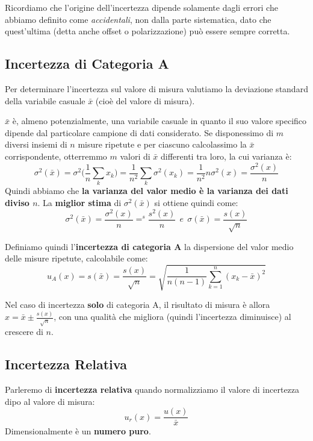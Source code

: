 \documentclass[a4paper,11pt]{report}
\begin{document}
Ricordiamo che l'origine dell'incertezza dipende solamente dagli errori che abbiamo definito come \textit{accidentali}, non dalla parte sistematica, dato che quest'ultima (detta anche offset o polarizzazione) può essere sempre corretta.

\subsection{Incertezza di Categoria A}
Per determinare l'incertezza sul valore di misura valutiamo la deviazione standard della variabile casuale $\bar{x}$ (cioè del valore di misura).

$\bar{x}$ è, almeno potenzialmente, una variabile casuale in quanto il suo valore specifico dipende dal particolare campione di dati considerato. Se disponessimo di $m$ diversi insiemi di $n$ misure ripetute e per ciascuno calcolassimo la $\bar{x}$ corrispondente, otterremmo $m$ valori di $\bar{x}$ differenti tra loro, la cui varianza è:
$$
  \sigma^2(\bar{x}) = \sigma^2\Bigg(\frac{1}{n}\sum_kx_k\Bigg) = 
  \frac{1}{n^2}\sum_k\sigma^2(x_k) = \frac{1}{n^2}n\sigma^2(x) =
  \frac{\sigma^2(x)}{n}
$$
Quindi abbiamo che \textbf{la varianza del valor medio è la varianza dei dati diviso $n$}.
La \textbf{miglior stima} di $\sigma^2(\bar{x})$ si ottiene quindi come\footnotemark[1] :
$$
  \sigma^2(\bar{x}) = \frac{\sigma^2(x)}{n} =^s \frac{s^2(x)}{n}\ \ e\ \ \sigma(\bar{x}) = \frac{s(x)}{\sqrt{n}}
$$

Definiamo quindi l'\textbf{incertezza di categoria A} la dispersione del valor medio delle misure ripetute, calcolabile come:
$$
  u_A(x) = s(\bar{x}) = \frac{s(x)}{\sqrt{n}} = \sqrt{\frac{1}{n(n-1)}\sum^n_{k=1}(x_k-\bar{x})^2}
$$

Nel caso di incertezza \textbf{solo} di categoria A, il risultato di misura è allora $x = \bar{x} \pm \frac{s(x)}{\sqrt{n}}$, con una qualità che migliora (quindi l'incertezza diminuisce) al crescere di $n$.
\subsection{Incertezza Relativa}
Parleremo di \textbf{incertezza relativa} quando normalizziamo il valore di incertezza dipo al valore di misura:
$$
  u_r(x) = \frac{u(x)}{\bar{x}}
$$
Dimensionalmente è un \textbf{numero puro}.
\end{document}
